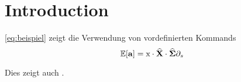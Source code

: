 \section{Introduction}
\label{sec:Introduction}

\eqref{eq:beispiel} zeigt die Verwendung von vordefinierten Kommands
\begin{equation}
	\label{eq:beispiel}
	\operatorname{\mathbb{E}} [\mathbf{a}] = \textnormal{x} \cdot \widehat{\mathbf{X}} \cdot \widehat{\mathbf{\Sigma}}
	\partial_s
\end{equation}

Dies zeigt auch \cite{Backhaus.2021}.